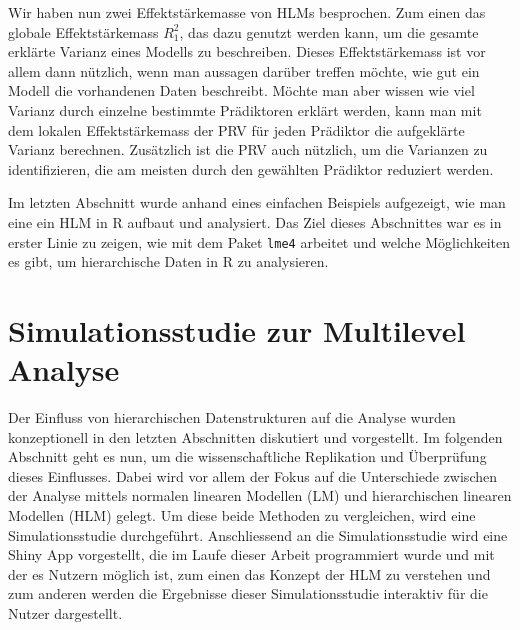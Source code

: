 \documentclass[12pt]{article}\usepackage[]{graphicx}\usepackage[]{color}
\begin{document}
Wir haben nun zwei Effektstärkemasse von HLMs besprochen. Zum einen das globale Effektstärkemass $R_{1}^2$, das dazu genutzt werden kann, um die gesamte erklärte Varianz eines Modells zu beschreiben. Dieses Effektstärkemass ist vor allem dann nützlich, wenn man aussagen darüber treffen möchte, wie gut ein Modell die vorhandenen Daten beschreibt. Möchte man aber wissen wie viel Varianz durch einzelne bestimmte Prädiktoren erklärt werden, kann man mit dem lokalen Effektstärkemass der PRV für jeden Prädiktor die aufgeklärte Varianz berechnen. Zusätzlich ist die PRV auch nützlich, um die Varianzen zu identifizieren, die am meisten durch den gewählten Prädiktor reduziert werden.

Im letzten Abschnitt wurde anhand eines einfachen Beispiels aufgezeigt, wie man eine ein HLM in R aufbaut und analysiert. Das Ziel dieses Abschnittes war es in erster Linie zu zeigen, wie mit dem Paket \texttt{lme4} arbeitet und welche Möglichkeiten es gibt, um hierarchische Daten in R zu analysieren.

\section{Simulationsstudie zur Multilevel Analyse}
Der Einfluss von hierarchischen Datenstrukturen auf die Analyse wurden konzeptionell in den letzten Abschnitten diskutiert und vorgestellt. Im folgenden Abschnitt geht es nun, um die wissenschaftliche Replikation und Überprüfung dieses Einflusses. Dabei wird vor allem der Fokus auf die Unterschiede zwischen der Analyse mittels normalen linearen Modellen (LM) und hierarchischen linearen Modellen (HLM) gelegt. Um diese beide Methoden zu vergleichen, wird eine Simulationsstudie durchgeführt. Anschliessend an die Simulationsstudie wird eine Shiny App \citep{shiny} vorgestellt, die im Laufe dieser Arbeit programmiert wurde und mit der es Nutzern möglich ist, zum einen das Konzept der HLM zu verstehen und zum anderen werden die Ergebnisse dieser Simulationsstudie interaktiv für die Nutzer dargestellt.
\end{document}
